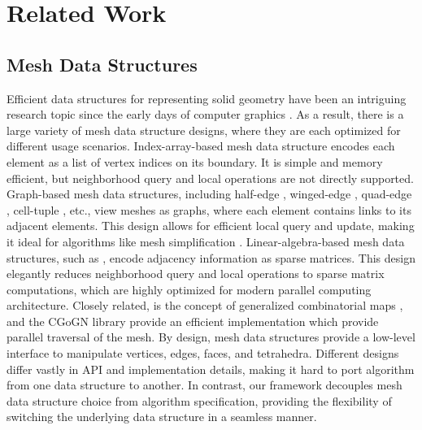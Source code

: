 \section{Related Work}
\label{wmtk:sec:related}

\subsection{Mesh Data Structures}

Efficient data structures for representing solid geometry have been an intriguing
research topic since the early days of computer graphics \cite{Requicha1980}. As
a result, there is a large variety of mesh data structure designs, where they
are each optimized for different usage scenarios. Index-array-based mesh data
structure encodes each element as a list of vertex indices on its
boundary.  It is simple and memory efficient, but neighborhood query and local
operations are not directly supported.
Graph-based mesh data structures, including half-edge \cite{Maentylae1987},
winged-edge \cite{Baumgart1972}, quad-edge \cite{Guibas1985}, cell-tuple
\cite{Brisson1989}, etc., view meshes as graphs, where each element contains
links to its adjacent elements. This design allows for efficient local query
and update, making it ideal for algorithms like mesh simplification
\cite{garland1997surface}. Linear-algebra-based mesh data structures, such as
\cite{Dicarlo2014,Zayer2017,Mahmoud2021}, encode adjacency information as sparse
matrices.  This design elegantly reduces neighborhood query and local operations
to sparse matrix computations, which are highly optimized for modern parallel
computing architecture. {Closely related, is the concept of generalized combinatorial maps \cite{lienhardt1994n, dufourd1991obj3}, and the CGoGN library \cite{kraemer2014cgogn} provide an efficient implementation which provide parallel traversal of the mesh.}
%
By design, mesh data structures provide a low-level interface to
manipulate vertices, edges, faces, and tetrahedra.
Different designs differ vastly in API and implementation details, making it hard to port algorithm from one data structure to another. In contrast, our framework decouples mesh data structure choice from algorithm specification, providing the flexibility of switching the underlying data structure in a seamless manner.







